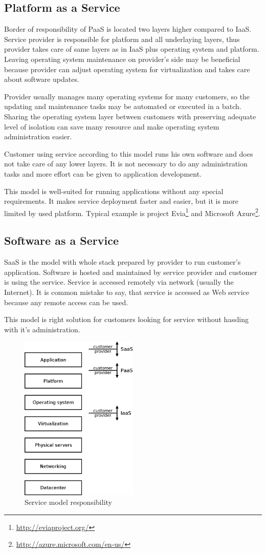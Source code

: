 \subsection{Platform as a Service}
Border of responsibility of \Ac{PaaS} is located two layers higher compared to \Ac{IaaS}. Service provider is responsible for platform and all underlaying layers, thus provider takes care of same layers as in \Ac{IaaS} plus operating system and platform. 
Leaving operating system maintenance on provider's side may be beneficial because provider can adjust operating system for virtualization and takes care about software updates. 

Provider usually manages many operating systems for many customers, so the updating and maintenance tasks may be automated or executed in a batch. Sharing the operating system layer between customers with preserving adequate level of isolation can save many resource and make operating system administration easier.

Customer using service according to this model runs his own software and does not take care of any lower layers. It is not necessary to do any administration tasks and more effort can be given to application development. 

This model is well-suited for running applications without any special requirements. It makes service deployment faster and easier, but it is more limited by used platform. 
Typical example is project Evia\footnote{\url{http://eviaproject.org/}} and Microsoft Azure\footnote{\url{http://azure.microsoft.com/en-us/}}.

\subsection{Software as a Service}
\Ac{SaaS} is the model with whole stack prepared by provider to run customer's application. Software is hosted and maintained by service provider and customer is using the service. Service is accessed remotely via network (usually the Internet). It is common mistake to say, that service is accessed as Web service because any remote access can be used. 

This model is right solution for customers looking for service without hassling with it's administration.

\begin{figure}[htb]
	\begin{center}
	\includegraphics[width=0.5\textwidth]{service-models.png}
	\end{center}
	\caption{Service model responsibility}
	\label{img:service-models}
\end{figure}

